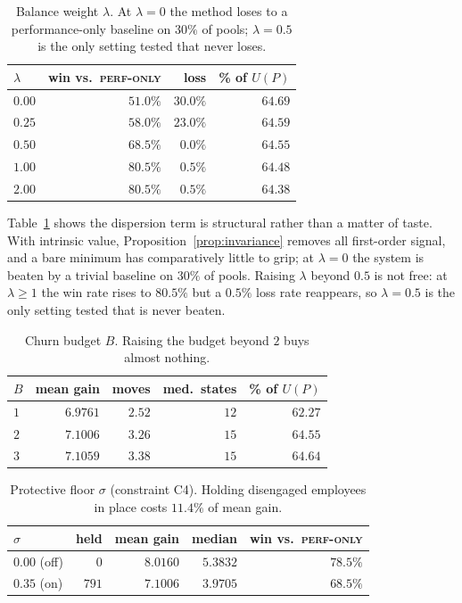 \documentclass[conference]{IEEEtran}
\begin{document}
\begin{table}[t]
\caption{Balance weight $\lambda$. At $\lambda=0$ the method loses to a
performance-only baseline on $30\%$ of pools; $\lambda=0.5$ is the only setting
tested that never loses.}
\label{tab:lambda}
\centering\small
\begin{tabular}{lrrr}
\toprule
$\lambda$ & win vs.\ \textsc{perf-only} & loss & \% of $U(P)$\\
\midrule
$0.00$ & $51.0\%$ & $\mathbf{30.0\%}$ & $64.69$\\
$0.25$ & $58.0\%$ & $23.0\%$ & $64.59$\\
$0.50$ & $68.5\%$ & $\mathbf{0.0\%}$ & $64.55$\\
$1.00$ & $80.5\%$ & $0.5\%$ & $64.48$\\
$2.00$ & $80.5\%$ & $0.5\%$ & $64.38$\\
\bottomrule
\end{tabular}
\end{table}

Table~\ref{tab:lambda} shows the dispersion term is structural rather than a
matter of taste. With intrinsic value, Proposition~\ref{prop:invariance} removes
all first-order signal, and a bare minimum has comparatively little to grip;
at $\lambda=0$ the system is beaten by a trivial baseline on $30\%$ of pools.
Raising $\lambda$ beyond $0.5$ is not free: at $\lambda\geq1$ the win rate rises to
$80.5\%$ but a $0.5\%$ loss rate reappears, so $\lambda=0.5$ is the only setting
tested that is never beaten.

\begin{table}[t]
\caption{Churn budget $B$. Raising the budget beyond $2$ buys almost nothing.}
\label{tab:budget}
\centering\small
\begin{tabular}{lrrrr}
\toprule
$B$ & mean gain & moves & med.\ states & \% of $U(P)$\\
\midrule
$1$ & $6.9761$ & $2.52$ & $12$ & $62.27$\\
$2$ & $7.1006$ & $3.26$ & $15$ & $64.55$\\
$3$ & $7.1059$ & $3.38$ & $15$ & $64.64$\\
\bottomrule
\end{tabular}
\end{table}

\begin{table}[t]
\caption{Protective floor $\sigma$ (constraint C4). Holding disengaged employees
in place costs $11.4\%$ of mean gain.}
\label{tab:floor}
\centering\small
\begin{tabular}{lrrrr}
\toprule
$\sigma$ & held & mean gain & median & win vs.\ \textsc{perf-only}\\
\midrule
$0.00$ (off) & $0$ & $8.0160$ & $5.3832$ & $78.5\%$\\
$0.35$ (on) & $791$ & $7.1006$ & $3.9705$ & $68.5\%$\\
\bottomrule
\end{tabular}
\end{table}
\end{document}
